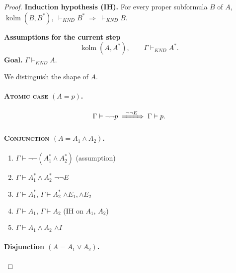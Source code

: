 \documentclass{article}
\begin{document}
    \begin{proof}
    \leavevmode\par
    \textbf{Induction hypothesis (IH).}\;
    For every proper subformula \(B\) of \(A\),
    \(
      \operatorname{kolm}(B,B^{*}),\;
      \vdash_{\textit{KND}} B^{*}
      \;\Rightarrow\;
      \vdash_{\textit{KND}} B .
    \)
    
    \medskip
    \textbf{Assumptions for the current step}
    \[
      \operatorname{kolm}(A,A^{*}),\qquad
      \Gamma\vdash_{\textit{KND}} A^{*}.
    \]
    \textbf{Goal.}\; \(\Gamma\vdash_{\textit{KND}} A\).
    
    \bigskip
    \noindent
    We distinguish the shape of \(A\).
    
    \paragraph{\textsc{Atomic case} \boldmath$(A=p)$.}
    \[
      \Gamma\vdash \neg\neg p
      \;\xRightarrow{\ \neg\neg E\ }\;
      \Gamma\vdash p.
    \]
    
    \paragraph{\textsc{Conjunction} \boldmath$(A=A_1\land A_2)$.}
    
    \begin{enumerate}[leftmargin=1.5em,labelsep=.5em,label={\textbf{Step~\arabic*:}}]
      \item \(\Gamma\vdash \neg\neg(A_1^{*}\land A_2^{*})\)
            \hfill(assumption)
      \item \(\Gamma\vdash A_1^{*}\land A_2^{*}\)
            \hfill\(\neg\neg E\)
      \item \(\Gamma\vdash A_1^{*}\), \;\(\Gamma\vdash A_2^{*}\)
            \hfill\(\land E_1,\land E_2\)
      \item \(\Gamma\vdash A_1\), \;\(\Gamma\vdash A_2\)
            \hfill(IH on \(A_1\), \(A_2\))
      \item \(\Gamma\vdash A_1\land A_2\)
            \hfill\(\land I\)
    \end{enumerate}
    
    \paragraph{Disjunction \boldmath$(A = A_{1}\lor A_{2})$.}
    

\end{proof}
\end{document}
